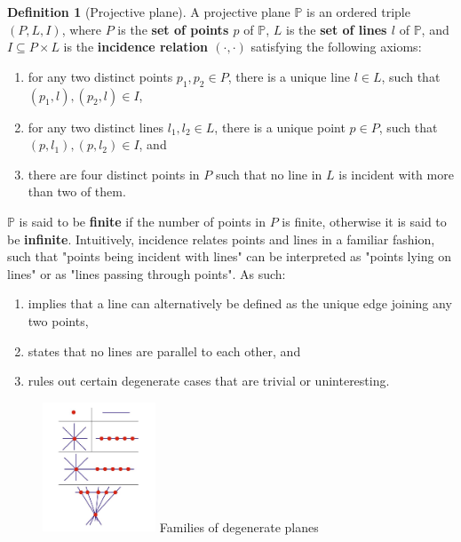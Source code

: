 \documentclass{report}
\renewcommand{\P}{\mathbb{P}}
\theoremstyle{definition}\newtheorem*{definition}{Definition}
\theoremstyle{definition}\newtheorem*{example}{Example}
\theoremstyle{remark}\newtheorem*{remark}{Remark}
\begin{document}
\begin{definition}[Projective plane]
A projective plane $ \P $ is an ordered triple $ (P, L, I) $, where $ P $ is the \textbf{set of points $ p $} of $ \P $, $ L $ is the \textbf{set of lines $ l $} of $ \P $, and $ I \subseteq P \times L $ is the \textbf{incidence relation $ (\cdot, \cdot) $} satisfying the following axioms:
\begin{enumerate}[label=(P\arabic*)]
  \item for any two distinct points $ p_1, p_2 \in P $, there is a unique line $ l \in L $, such that $ (p_1, l), (p_2, l) \in I $,
  \item for any two distinct lines $ l_1, l_2 \in L $, there is a unique point $ p \in P $, such that $ (p, l_1), (p, l_2) \in I $, and
  \item there are four distinct points in $ P $ such that no line in $ L $ is incident with more than two of them.
\end{enumerate}
\end{definition}
$ \P $ is said to be \textbf{finite} if the number of points in $ P $ is finite, otherwise it is said to be \textbf{infinite}. Intuitively, incidence relates points and lines in a familiar fashion, such that "points being incident with lines" can be interpreted as "points lying on lines" or as "lines passing through points". As such:
\begin{enumerate}[label=(P\arabic*)]
  \item implies that a line can alternatively be defined as the unique edge joining any two points,
  \item states that no lines are parallel to each other, and
  \item rules out certain degenerate cases that are trivial or uninteresting.
\end{enumerate}

\pagebreak

\begin{figure}
\includegraphics[width=0.3\textwidth]{figures/degenerate.jpg}
Families of degenerate planes
\end{figure}
\end{document}
